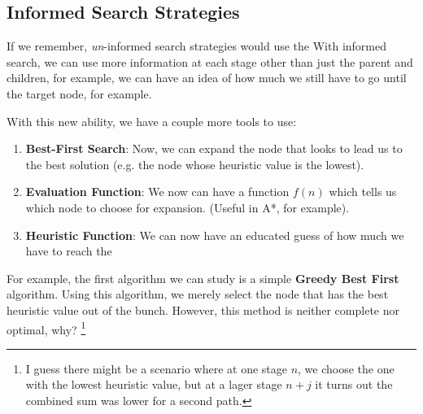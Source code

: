 \documentclass{tufte-handout}
\begin{document}
\subsection{Informed Search Strategies}
If we remember, \textit{un}-informed search strategies would use the 
With informed search, we can use more information at each stage other than just the parent and children,
	for example, we can have an idea of how much we still have to go until the target node, for example.

With this new ability, we have a couple more tools to use:
\begin{enumerate}
	\item \textbf{Best-First Search}: Now, we can expand the node that looks to lead us to the 
		best solution (e.g. the node whose heuristic value is the lowest).
	\item \textbf{Evaluation Function}: We now can have a function $f(n)$ which tells us which node
		to choose for expansion. (Useful in A*, for example).
	\item \textbf{Heuristic Function}: We can now have an educated guess of how much we have to reach the 
		
\end{enumerate}

For example, the first algorithm we can study is a simple \textbf{Greedy Best First} algorithm. 
Using this algorithm, we merely select the node that has the best heuristic value out of the bunch.
However, this method is neither complete nor optimal, why?
\footnote{I guess there might be a scenario where at one stage $n$, we choose the one with the lowest
	heuristic value, but at a lager stage $n+j$ it turns out the combined sum was lower for a second path.}
\end{document}
